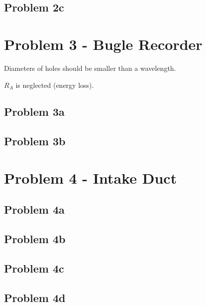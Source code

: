 \subsection*{Problem 2c}










\newpage
\section*{Problem 3 - Bugle Recorder}

Diameters of holes should be smaller than a wavelength.

$R_A$ is neglected (energy loss).

\subsection*{Problem 3a}

\subsection*{Problem 3b}










\newpage
\section*{Problem 4 - Intake Duct}

\subsection*{Problem 4a}

\subsection*{Problem 4b}

\subsection*{Problem 4c}

\subsection*{Problem 4d}










